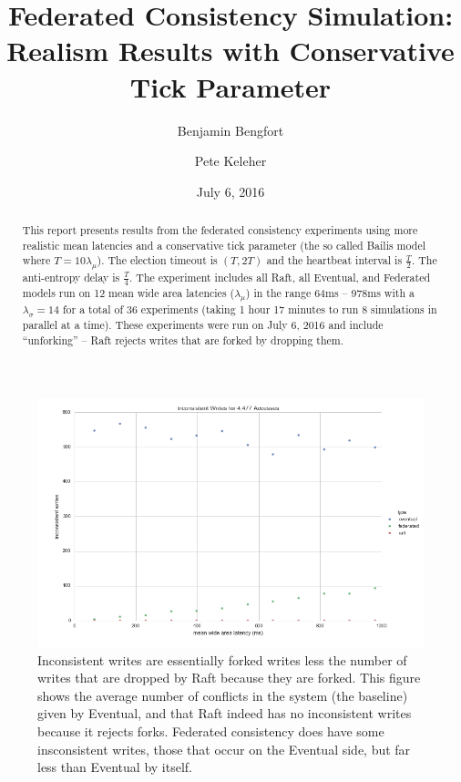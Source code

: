 \documentclass[11pt,letterpaper]{article}
\title{Federated Consistency Simulation: \\
 Realism Results with Conservative Tick Parameter}
\date{July 6, 2016}
\author[ ]{Benjamin Bengfort}
\author[ ]{Pete Keleher}
\affil[ ]{Department of Computer Science}
\affil[ ]{University of Maryland}
\affil[ ]{\textit{\{bengfort,keleher\}@cs.umd.edu}}
\begin{document}
\maketitle

\begin{abstract}
This report presents results from the federated consistency experiments using more realistic mean latencies and a conservative tick parameter (the so called Bailis model where $T=10\lambda_{\mu}$). The election timeout is $(T, 2T)$ and the heartbeat interval is $\frac{T} {2}$. The anti-entropy delay is $\frac {T} {4}$. The experiment includes all Raft, all Eventual, and Federated models run on 12 mean wide area latencies ($\lambda_{\mu}$) in the range 64ms -- 978ms with a $\lambda_{\sigma}=14$ for a total of 36 experiments (taking 1 hour 17 minutes to run 8 simulations in parallel at a time). These experiments were run on July 6, 2016 and include ``unforking'' -- Raft rejects writes that are forked by dropping them.
\end{abstract}

\begin{figure}[!h]
    \centering
        \includegraphics[width=\textwidth]{figures/inconsistent_writes.png}
        \caption{\textsf{Inconsistent writes are essentially forked writes less the number of writes that are dropped by Raft because they are forked. This figure shows the average number of conflicts in the system (the baseline) given by Eventual, and that Raft indeed has no inconsistent writes because it rejects forks. Federated consistency does have some insconsistent writes, those that occur on the Eventual side, but far less than Eventual by itself.}}
        \label{fig:inconsistent_writes}
\end{figure}
\end{document}
